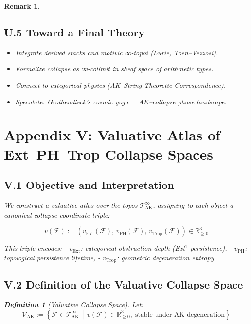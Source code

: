 \documentclass[11pt]{article}
\newtheorem{definition}[theorem]{Definition}
\newtheorem{remark}[theorem]{Remark}
\begin{document}
\begin{remark}
\subsection*{U.5 Toward a Final Theory}

\begin{itemize}
  \item Integrate derived stacks and motivic ∞-topoi (Lurie, Toen–Vezzosi).
  \item Formalize collapse as ∞-colimit in sheaf space of arithmetic types.
  \item Connect to categorical physics (AK–String Theoretic Correspondence).
  \item Speculate: Grothendieck’s cosmic yoga = AK–collapse phase landscape.
\end{itemize}


\section*{Appendix V: Valuative Atlas of Ext–PH–Trop Collapse Spaces}

\subsection*{V.1 Objective and Interpretation}

We construct a valuative atlas over the topos \( \mathscr{T}_{\mathrm{AK}}^{\infty} \),  
assigning to each object a canonical collapse coordinate triple:

\[
v(\mathcal{F}) := 
\left( v_{\mathrm{Ext}}(\mathcal{F}), \, v_{\mathrm{PH}}(\mathcal{F}), \, v_{\mathrm{Trop}}(\mathcal{F}) \right)
\in \mathbb{R}_{\geq 0}^3
\]

This triple encodes:
- \( v_{\mathrm{Ext}} \): categorical obstruction depth (Ext$^1$ persistence),
- \( v_{\mathrm{PH}} \): topological persistence lifetime,
- \( v_{\mathrm{Trop}} \): geometric degeneration entropy.

\subsection*{V.2 Definition of the Valuative Collapse Space}

\begin{definition}[Valuative Collapse Space]
Let:
\[
\mathscr{V}_{\mathrm{AK}} := 
\left\{
  \mathcal{F} \in \mathscr{T}_{\mathrm{AK}}^{\infty} \,\middle|\,
  v(\mathcal{F}) \in \mathbb{R}_{\geq 0}^3, \;
  \text{stable under AK-degeneration}
\right\}
\]


\end{definition}
\end{remark}
\end{document}
